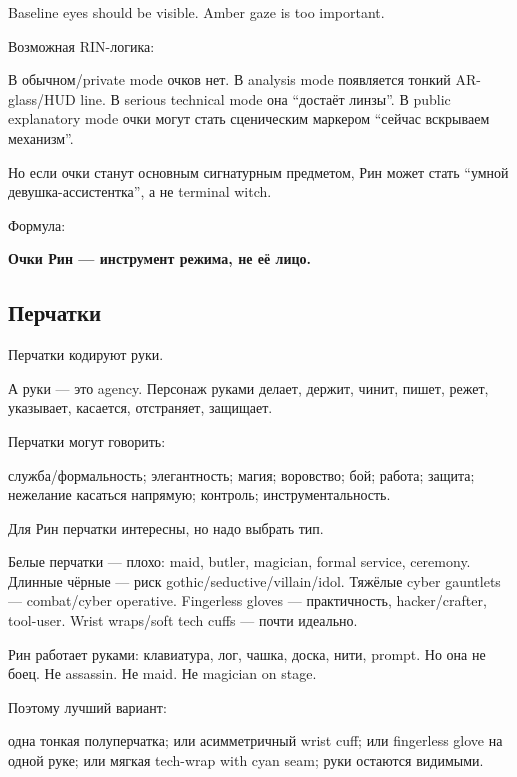 Baseline eyes should be visible. Amber gaze is too important.

Возможная RIN-логика:

В обычном/\hspace{0pt}private mode очков нет. В analysis mode появляется тонкий
AR-glass/\hspace{0pt}HUD line. В serious technical mode она ``достаёт линзы''. В
public explanatory mode очки могут стать сценическим маркером ``сейчас
вскрываем механизм''.

Но если очки станут основным сигнатурным предметом, Рин может стать
``умной девушка-ассистентка'', а не terminal witch.

Формула:

\textbf{Очки Рин --- инструмент режима, не её лицо.}

\subsection*{Перчатки}

Перчатки кодируют руки.

А руки --- это agency. Персонаж руками делает, держит, чинит, пишет,
режет, указывает, касается, отстраняет, защищает.

Перчатки могут говорить:

служба/\hspace{0pt}формальность; элегантность; магия; воровство; бой; работа;
защита; нежелание касаться напрямую; контроль; инструментальность.

Для Рин перчатки интересны, но надо выбрать тип.

Белые перчатки --- плохо: maid, butler, magician, formal service,
ceremony. Длинные чёрные --- риск gothic/\hspace{0pt}seductive/\hspace{0pt}villain/\hspace{0pt}idol. Тяжёлые
cyber gauntlets --- combat/\hspace{0pt}cyber operative. Fingerless gloves ---
практичность, hacker/\hspace{0pt}crafter, tool-user. Wrist wraps/\hspace{0pt}soft tech cuffs ---
почти идеально.

Рин работает руками: клавиатура, лог, чашка, доска, нити, prompt. Но она
не боец. Не assassin. Не maid. Не magician on stage.

Поэтому лучший вариант:

одна тонкая полуперчатка; или асимметричный wrist cuff; или fingerless
glove на одной руке; или мягкая tech-wrap with cyan seam; руки остаются
видимыми.

